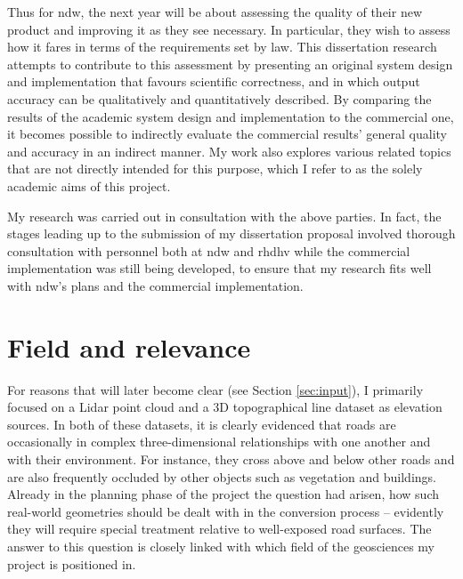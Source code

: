 Thus for \ac{ndw}, the next year will be about assessing the quality of their new product and improving it as they see necessary. In particular, they wish to assess how it fares in terms of the requirements set by law. This dissertation research attempts to contribute to this assessment by presenting an original system design and implementation that favours scientific correctness, and in which output accuracy can be qualitatively and quantitatively described. By comparing the results of the academic system design and implementation to the commercial one, it becomes possible to indirectly evaluate the commercial results' general quality and accuracy in an indirect manner. My work also explores various related topics that are not directly intended for this purpose, which I refer to as the solely academic aims of this project.

My research was carried out in consultation with the above parties. In fact, the stages leading up to the submission of my dissertation proposal involved thorough consultation with personnel both at \ac{ndw} and \ac{rhdhv} while the commercial implementation was still being developed, to ensure that my research fits well with \ac{ndw}'s plans and the commercial implementation.

\section{Field and relevance}
\label{sec:relevance}

For reasons that will later become clear (see Section \ref{sec:input}), I primarily focused on a Lidar point cloud and a 3D topographical line dataset as elevation sources. In both of these datasets, it is clearly evidenced that roads are occasionally in complex three-dimensional relationships with one another and with their environment. For instance, they cross above and below other roads and are also frequently occluded by other objects such as vegetation and buildings. Already in the planning phase of the project the question had arisen, how such real-world geometries should be dealt with in the conversion process – evidently they will require special treatment relative to well-exposed road surfaces. The answer to this question is closely linked with which field of the geosciences my project is positioned in.

